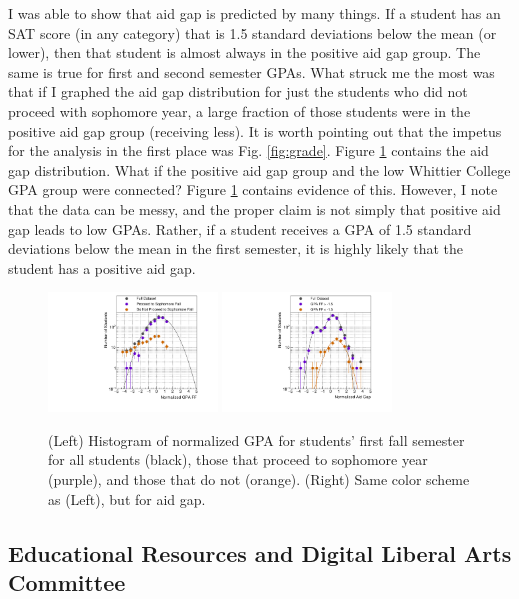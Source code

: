 \documentclass[../../../main.tex]{subfiles}
\begin{document}
I was able to show that aid gap is predicted by many things.  If a student has an SAT score (in any category) that is 1.5 standard deviations below the mean (or lower), then that student is almost always in the positive aid gap group.  The same is true for first and second semester GPAs.  What struck me the most was that if I graphed the aid gap distribution for just the students who did not proceed with sophomore year, a large fraction of those students were in the positive aid gap group (receiving less).  It is worth pointing out that the impetus for the analysis in the first place was Fig. \ref{fig:grade}.  Figure \ref{fig:grade2} contains the aid gap distribution.  What if the positive aid gap group and the low Whittier College GPA group were connected?  Figure \ref{fig:grade2} contains evidence of this.  However, I note that the data can be messy, and the proper claim is not simply that positive aid gap leads to low GPAs.  Rather, if a student receives a GPA of 1.5 standard deviations below the mean in the first semester, it is highly likely that the student has a positive aid gap.

\begin{figure}
\centering
\includegraphics[width=0.4\textwidth]{figures/Dec5_plot6.pdf}
\includegraphics[width=0.4\textwidth]{figures/Dec4_plot5.pdf}
\caption{\label{fig:grade2} (Left) Histogram of normalized GPA for students' first fall semester for all students (black), those that proceed to sophomore year (purple), and those that do not (orange).  (Right) Same color scheme as (Left), but for aid gap.}
\end{figure}

\subsection{Educational Resources and Digital Liberal Arts Committee}
\end{document}
